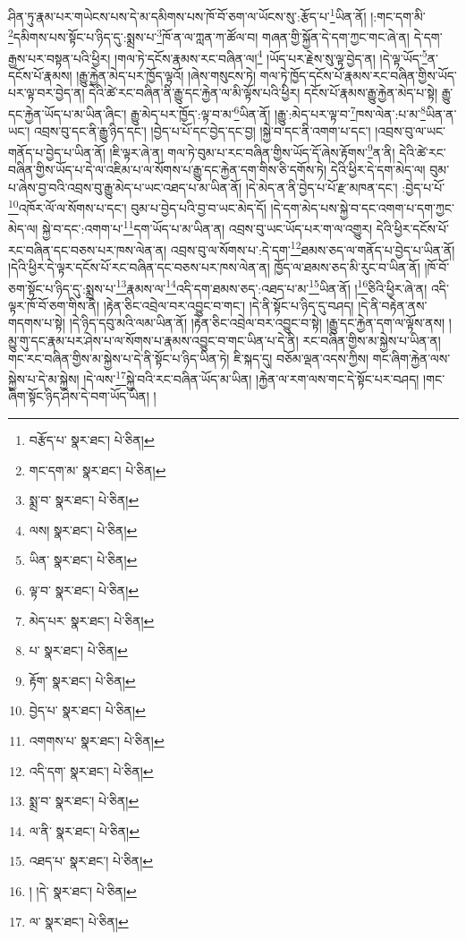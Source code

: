 ཤིན་ཏུ་རྣམ་པར་གཡེངས་པས་དེ་མ་དམིགས་པས་ཁོ་བོ་ཅག་ལ་ཡོངས་སུ་:རྩོད་པ་\footnote{བརྩོད་པ་  སྣར་ཐང་།  པེ་ཅིན། }ཡིན་ནོ། །:གང་དག་མི་\footnote{གང་དག་མ་  སྣར་ཐང་།  པེ་ཅིན། }དམིགས་པས་སྟོང་པ་ཉིད་དུ་:སྨྲས་པ་\footnote{སྨྲ་བ་  སྣར་ཐང་།  པེ་ཅིན། }ཁོ་ན་ལ་ཀླན་ཀ་ཚོལ་བ། གཞན་གྱི་སྐྱོན་དེ་དག་ཀྱང་གང་ཞེ་ན། དེ་དག་རྒྱས་པར་བསྟན་པའི་ཕྱིར། །གལ་ཏེ་དངོས་རྣམས་རང་བཞིན་ལ།\footnote{ལས།  སྣར་ཐང་།  པེ་ཅིན། } །ཡོད་པར་རྗེས་སུ་ལྟ་བྱེད་ན། །དེ་ལྟ་ཡོད་\footnote{ཡིན་  སྣར་ཐང་།  པེ་ཅིན། }ན་དངོས་པོ་རྣམས། །རྒྱུ་རྐྱེན་མེད་པར་ཁྱོད་ལྟའོ། །ཞེས་གསུངས་ཏེ། གལ་ཏེ་ཁྱོད་དངོས་པོ་རྣམས་རང་བཞིན་གྱིས་ཡོད་པར་ལྟ་བར་བྱེད་ན། དེའི་ཚེ་རང་བཞིན་ནི་རྒྱུ་དང་རྐྱེན་ལ་མི་ལྟོས་པའི་ཕྱིར། དངོས་པོ་རྣམས་རྒྱུ་རྐྱེན་མེད་པ་སྟེ། རྒྱུ་དང་རྐྱེན་ཡོད་པ་མ་ཡིན་ཞིང་། རྒྱུ་མེད་པར་ཁྱོད་:ལྟ་བ་མ་\footnote{ལྟ་བ་  སྣར་ཐང་།  པེ་ཅིན། }ཡིན་ནོ། །རྒྱུ་:མེད་པར་ལྟ་བ་\footnote{མེད་པར་  སྣར་ཐང་།  པེ་ཅིན། }ཁས་ལེན་:པ་མ་\footnote{པ་  སྣར་ཐང་།  པེ་ཅིན། }ཡིན་ན་ཡང་། འབྲས་བུ་དང་ནི་རྒྱུ་ཉིད་དང་། །བྱེད་པ་པོ་དང་བྱེད་དང་བྱ། །སྐྱེ་བ་དང་ནི་འགག་པ་དང་། །འབྲས་བུ་ལ་ཡང་གནོད་པ་བྱེད་པ་ཡིན་ནོ། །ཇི་ལྟར་ཞེ་ན། གལ་ཏེ་བུམ་པ་རང་བཞིན་གྱིས་ཡོད་དོ་ཞེས་རྟོགས་\footnote{རྟོག་  སྣར་ཐང་།  པེ་ཅིན། }ན་ནི། དེའི་ཚེ་རང་བཞིན་གྱིས་ཡོད་པ་དེ་ལ་འཇིམ་པ་ལ་སོགས་པ་རྒྱུ་དང་རྐྱེན་དག་གིས་ཅི་དགོས་ཏེ། དེའི་ཕྱིར་དེ་དག་མེད་ལ། བུམ་པ་ཞེས་བྱ་བའི་འབྲས་བུ་རྒྱུ་མེད་པ་ཡང་འཐད་པ་མ་ཡིན་ནོ། །དེ་མེད་ན་ནི་བྱེད་པ་པོ་རྫ་མཁན་དང་། :བྱེད་པ་པོ་\footnote{བྱེད་པ་  སྣར་ཐང་།  པེ་ཅིན། }འཁོར་ལོ་ལ་སོགས་པ་དང་། བུམ་པ་བྱེད་པའི་བྱ་བ་ཡང་མེད་དོ། །དེ་དག་མེད་པས་སྐྱེ་བ་དང་འགག་པ་དག་ཀྱང་མེད་ལ། སྐྱེ་བ་དང་:འགག་པ་\footnote{འགགས་པ་  སྣར་ཐང་།  པེ་ཅིན། }དག་ཡོད་པ་མ་ཡིན་ན། འབྲས་བུ་ཡང་ཡོད་པར་ག་ལ་འགྱུར། དེའི་ཕྱིར་དངོས་པོ་རང་བཞིན་དང་བཅས་པར་ཁས་ལེན་ན། འབྲས་བུ་ལ་སོགས་པ་:དེ་དག་\footnote{འདི་དག་  སྣར་ཐང་།  པེ་ཅིན། }ཐམས་ཅད་ལ་གནོད་པ་བྱེད་པ་ཡིན་ནོ། །དེའི་ཕྱིར་དེ་ལྟར་དངོས་པོ་རང་བཞིན་དང་བཅས་པར་ཁས་ལེན་ན། ཁྱོད་ལ་ཐམས་ཅད་མི་རུང་བ་ཡིན་ནོ། །ཁོ་བོ་ཅག་སྟོང་པ་ཉིད་དུ་:སྨྲས་པ་\footnote{སྨྲ་བ་  སྣར་ཐང་།  པེ་ཅིན། }རྣམས་ལ་\footnote{ལ་ནི་  སྣར་ཐང་།  པེ་ཅིན། }འདི་དག་ཐམས་ཅད་:འཐད་པ་མ་\footnote{འཐད་པ་  སྣར་ཐང་།  པེ་ཅིན། }ཡིན་ནོ། །\footnote{། །དེ་  སྣར་ཐང་།  པེ་ཅིན། }ཅིའི་ཕྱིར་ཞེ་ན། འདི་ལྟར་ཁོ་བོ་ཅག་གིས་ནི། །རྟེན་ཅིང་འབྲེལ་བར་འབྱུང་བ་གང་། །དེ་ནི་སྟོང་པ་ཉིད་དུ་བཤད། །དེ་ནི་བརྟེན་ནས་གདགས་པ་སྟེ། །དེ་ཉིད་དབུ་མའི་ལམ་ཡིན་ནོ། །རྟེན་ཅིང་འབྲེལ་བར་འབྱུང་བ་སྟེ། །རྒྱུ་དང་རྐྱེན་དག་ལ་ལྟོས་ནས། །མྱུ་གུ་དང་རྣམ་པར་ཤེས་པ་ལ་སོགས་པ་རྣམས་འབྱུང་བ་གང་ཡིན་པ་དེ་ནི། རང་བཞིན་གྱིས་མ་སྐྱེས་པ་ཡིན་ན། གང་རང་བཞིན་གྱིས་མ་སྐྱེས་པ་དེ་ནི་སྟོང་པ་ཉིད་ཡིན་ཏེ། ཇི་སྐད་དུ། བཅོམ་ལྡན་འདས་ཀྱིས། གང་ཞིག་རྐྱེན་ལས་སྐྱེས་པ་དེ་མ་སྐྱེས། །དེ་ལས་\footnote{ལ་  སྣར་ཐང་།  པེ་ཅིན། }སྐྱེ་བའི་རང་བཞིན་ཡོད་མ་ཡིན། །རྐྱེན་ལ་རག་ལས་གང་དེ་སྟོང་པར་བཤད། །གང་ཞིག་སྟོང་ཉིད་ཤེས་དེ་བག་ཡོད་ཡིན། །
